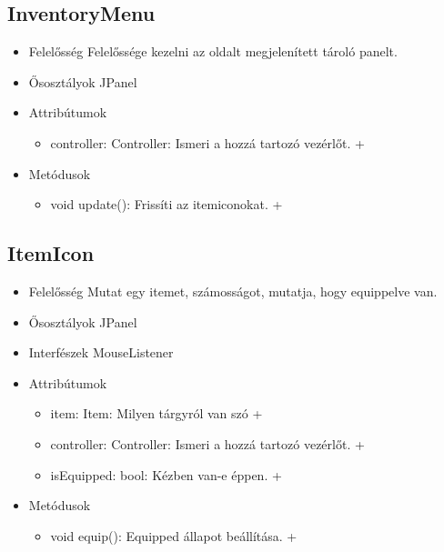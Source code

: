 \subsection{InventoryMenu}
\begin{itemize}
	\item Felelősség\newline
	Felelőssége kezelni az oldalt megjelenített tároló panelt.
	\item Ősosztályok\newline
	JPanel
	\item Attribútumok\newline
	\begin{itemize}
		\item controller: Controller: Ismeri a hozzá tartozó vezérlőt. +	
	\end{itemize}
	\item Metódusok\newline
	\begin{itemize}
		\item void update(): Frissíti az itemiconokat. +
	\end{itemize}
\end{itemize}

\subsection{ItemIcon}
\begin{itemize}
	\item Felelősség\newline
	Mutat egy itemet, számosságot, mutatja, hogy equippelve van.
	\item Ősosztályok\newline
	JPanel
	\item Interfészek\newline
	MouseListener
	\item Attribútumok\newline
	\begin{itemize}
		\item item: Item: Milyen tárgyról van szó +
		\item controller: Controller: Ismeri a hozzá tartozó vezérlőt. +	
		\item isEquipped: bool: Kézben van-e éppen. +
	\end{itemize}
	\item Metódusok\newline
	\begin{itemize}
		\item void equip(): Equipped állapot beállítása. +
	\end{itemize}
\end{itemize}

